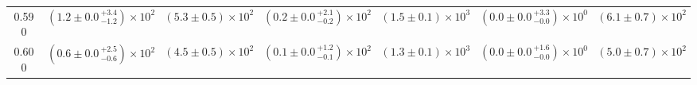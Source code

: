 \begin{center}
\begin{landscape}
\begin{table}[h!]
\begin{tabular}{ccccccc}
0.590 & $\left(1.2 \pm 0.0 \, _{-1.2}^{+3.4} \right) \times 10^{2}$ & $\left(5.3 \pm 0.5\right) \times 10^{2}$ & $\left(0.2 \pm 0.0 \, _{-0.2}^{+2.1} \right) \times 10^{2}$ & $\left(1.5 \pm 0.1\right) \times 10^{3}$ & $\left(0.0 \pm 0.0 \, _{-0.0}^{+3.3} \right) \times 10^{0}$ & $\left(6.1 \pm 0.7\right) \times 10^{2}$ \\
0.600 & $\left(0.6 \pm 0.0 \, _{-0.6}^{+2.5} \right) \times 10^{2}$ & $\left(4.5 \pm 0.5\right) \times 10^{2}$ & $\left(0.1 \pm 0.0 \, _{-0.1}^{+1.2} \right) \times 10^{2}$ & $\left(1.3 \pm 0.1\right) \times 10^{3}$ & $\left(0.0 \pm 0.0 \, _{-0.0}^{+1.6} \right) \times 10^{0}$ & $\left(5.0 \pm 0.7\right) \times 10^{2}$ \\
\hline
\end{tabular}
\end{table}


\end{landscape}
\end{center}
